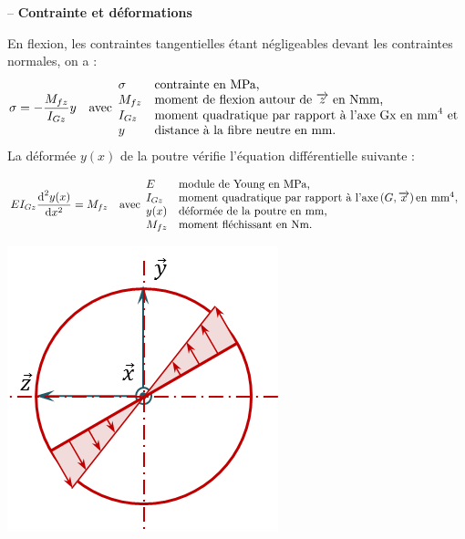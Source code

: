 \documentclass[10pt,fleqn]{article} %
\begin{document}
\begin{defi} -- 
\textbf{Contrainte et déformations} ~\\
\begin{minipage}[c]{.7\linewidth}
En flexion, les contraintes tangentielles étant négligeables devant les contraintes normales, on a : 
$$ \sigma = - \dfrac{M_{fz}}{I_{Gz}}y
\quad 
\text{avec}
\begin{array}{ll}
\sigma &\text{contrainte en \text{MPa},}\\
M_{fz} &\text{moment de flexion autour de $\overrightarrow{z_{}}$ en Nmm,} \\
I_{Gz} &\text{moment quadratique par rapport à l'axe Gx en mm}^4 \text{ et} \\
y &\text{distance à la fibre neutre en mm.}
\end{array}
$$
La déformée $y(x)$ de la poutre vérifie l'équation différentielle suivante :

$$
EI_{Gz}\dfrac{\text{d}^2 y(x) }{\text{d} x^2} = M_{fz}
\quad 
\text{avec}
\begin{array}{ll}
E &\text{module de Young en MPa,}\\
I_{Gz} &\text{moment quadratique par rapport à l'axe} \left(G,\overrightarrow{x} \right) \text{en mm}^4, \\
y(x) &\text{déformée de la poutre en mm,} \\
M_{fz} &\text{moment fléchissant en Nm.} \\
\end{array}
$$

\end{minipage} \hfill
\begin{minipage}[c]{.25\linewidth}
\begin{center}
\includegraphics[width=.9\linewidth]{images/contrainte_torsion}
\end{center}
\end{minipage}
\end{defi}
\end{document}
